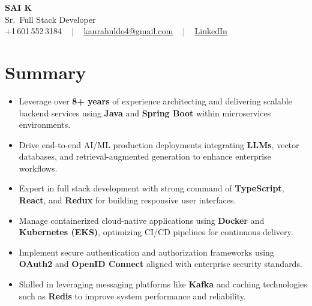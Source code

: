 \documentclass[letterpaper,11pt]{article}
\newcommand{\resumeItem}[1]{
  \item\footnotesize{
    {#1 \vspace{-2pt}}
  }
}
\newcommand{\resumeItemListStart}{\begin{itemize}[leftmargin=*]}
\newcommand{\resumeItemListEnd}{\end{itemize}\vspace{-5pt}}
\begin{document}
\begin{center}
    {\fontsize{14pt}{12pt}\selectfont \textbf{\MakeUppercase{Sai K}}}\\ \vspace{2pt}
    \fontsize{10pt}{12pt}\selectfont Sr.\ Full Stack Developer\\ \vspace{2pt}
    \fontsize{10pt}{12pt}\selectfont +1\,601\,552\,3184 ~ | ~
    \href{mailto:kanrahuldo4@gmail.com}{kanrahuldo4@gmail.com} ~ | ~
    \href{https://www.linkedin.com/in/srrrk/}{\color{blue}\underline{LinkedIn}}
    \vspace{-10pt}
\end{center}

\section{Summary}
\fontsize{9pt}{10pt}\selectfont
\resumeItemListStart
  \resumeItem{Leverage over \textbf{8+ years} of experience architecting and delivering scalable backend services using \textbf{Java} and \textbf{Spring Boot} within microservices environments.}
  \resumeItem{Drive end-to-end AI/ML production deployments integrating \textbf{LLMs}, vector databases, and retrieval-augmented generation to enhance enterprise workflows.}
  \resumeItem{Expert in full stack development with strong command of \textbf{TypeScript}, \textbf{React}, and \textbf{Redux} for building responsive user interfaces.}
  \resumeItem{Manage containerized cloud-native applications using \textbf{Docker} and \textbf{Kubernetes (EKS)}, optimizing CI/CD pipelines for continuous delivery.}
  \resumeItem{Implement secure authentication and authorization frameworks using \textbf{OAuth2} and \textbf{OpenID Connect} aligned with enterprise security standards.}
  \resumeItem{Skilled in leveraging messaging platforms like \textbf{Kafka} and caching technologies such as \textbf{Redis} to improve system performance and reliability.}
\resumeItemListEnd
\vspace{-6pt}

\end{document}
